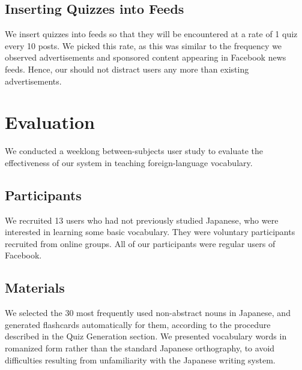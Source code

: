 \documentclass{chi-ext}
\begin{document}
\subsection{Inserting Quizzes into Feeds}

We insert quizzes into feeds so that they will be encountered at a rate of 1 quiz every 10 posts. We picked this rate, as this was similar to the frequency we observed advertisements and sponsored content appearing in Facebook news feeds. Hence, our should not distract users any more than existing advertisements. %

\section{Evaluation}

We conducted a weeklong between-subjects user study to evaluate the effectiveness of our system in teaching foreign-language vocabulary.


\subsection{Participants}

We recruited 13 users who had not previously studied Japanese, who were interested in learning some basic vocabulary. They were voluntary participants recruited from online groups. All of our participants were regular users of Facebook. %


\subsection{Materials}

We selected the 30 most frequently used non-abstract nouns in Japanese, and generated flashcards automatically for them, according to the procedure described in the Quiz Generation section. We presented vocabulary words in romanized form rather than the standard Japanese orthography, to avoid difficulties resulting from unfamiliarity with the Japanese writing system.
\end{document}
